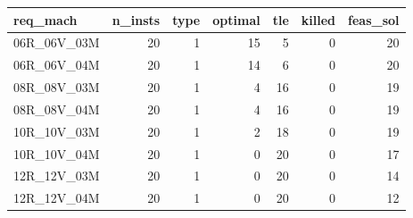 
\begin{tabular}{lrrrrrr}
\toprule
req\_mach & n\_insts & type & optimal & tle & killed & feas\_sol\\
\midrule
06R\_06V\_03M & 20 & 1 & 15 & 5 & 0 & 20\\
06R\_06V\_04M & 20 & 1 & 14 & 6 & 0 & 20\\
08R\_08V\_03M & 20 & 1 & 4 & 16 & 0 & 19\\
08R\_08V\_04M & 20 & 1 & 4 & 16 & 0 & 19\\
10R\_10V\_03M & 20 & 1 & 2 & 18 & 0 & 19\\
\addlinespace
10R\_10V\_04M & 20 & 1 & 0 & 20 & 0 & 17\\
12R\_12V\_03M & 20 & 1 & 0 & 20 & 0 & 14\\
12R\_12V\_04M & 20 & 1 & 0 & 20 & 0 & 12\\
\bottomrule
\end{tabular}
